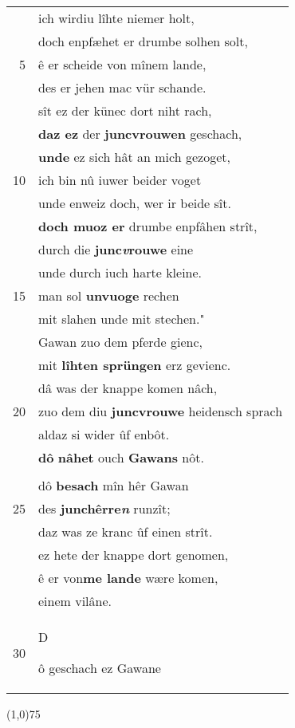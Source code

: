\documentclass[8pt,a4paper,notitlepage]{article}
\begin{document}
\begin{table}[ht]
\begin{minipage}[t]{0.5\linewidth}
\begin{tabular}{rl}
 & ich wirdiu lîhte niemer holt,\\ 
 & doch enpfæhet er drumbe solhen solt,\\ 
5 & ê er scheide von mînem lande,\\ 
 & des er jehen mac vür schande.\\ 
 & sît ez der künec dort niht rach,\\ 
 & \textbf{daz ez} der \textbf{juncvrouwen} geschach,\\ 
 & \textbf{unde} ez sich hât an mich gezoget,\\ 
10 & ich bin nû iuwer beider voget\\ 
 & unde enweiz doch, wer ir beide sît.\\ 
 & \textbf{doch muoz er} drumbe enpfâhen strît,\\ 
 & durch die \textbf{junc\textit{v}rouwe} eine\\ 
 & unde durch iuch harte kleine.\\ 
15 & man sol \textbf{unvuoge} rechen\\ 
 & mit slahen unde mit stechen."\\ 
 & Gawan zuo dem pferde gienc,\\ 
 & mit \textbf{lîhten sprüngen} erz gevienc.\\ 
 & dâ was der knappe komen nâch,\\ 
20 & zuo dem diu \textbf{juncvrouwe} heidensch sprach\\ 
 & aldaz si wider ûf enbôt.\\ 
 & \textbf{dô} \textbf{nâhet} ouch \textbf{Gawans} nôt.\\ 
 & \textit{\begin{large}M\end{large}}alacreature ze vuoz \textbf{vuor} dan.\\ 
 & dô \textbf{besach} mîn hêr Gawan\\ 
25 & des \textbf{junchêrre\textit{n}} runzît;\\ 
 & daz was ze kranc ûf einen strît.\\ 
 & ez hete der knappe dort genomen,\\ 
 & ê er von\textbf{me lande} wære komen,\\ 
 & einem vilâne.\\ 
30 & \begin{large}D\end{large}ô geschach ez Gawane\\ 
\end{tabular}
\scriptsize
\line(1,0){75} \newline

\end{minipage}
\end{table}
\end{document}
